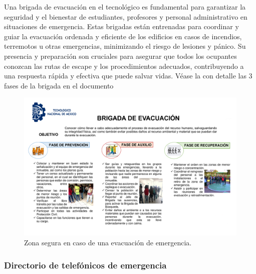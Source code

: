     Una brigada de evacuación en el tecnológico es fundamental para garantizar la seguridad y el bienestar de estudiantes, profesores y personal administrativo en situaciones de emergencia. Estas brigadas están entrenadas para coordinar y guiar la evacuación ordenada y eficiente de los edificios en casos de incendios, terremotos u otras emergencias, minimizando el riesgo de lesiones y pánico. Su presencia y preparación son cruciales para asegurar que todos los ocupantes conozcan las rutas de escape y los procedimientos adecuados, contribuyendo a una respuesta rápida y efectiva que puede salvar vidas. Véase la con detalle las 3 fases de la brigada en el documento
    \begin{figure}[H]
        \centering
        \includegraphics[scale=0.13]{35/Img/brigadaEvacuacion.pdf}
        \caption{Zona segura en caso de una evacuación de emergencia.}
    \end{figure}
    
    
    \subsubsection{Directorio de telefónicos de emergencia}
    
